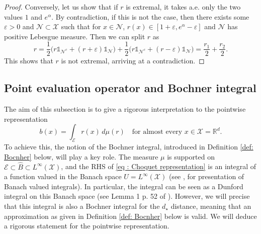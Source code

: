\documentclass[a4paper, 11pt]{article}
\theoremstyle{definition}
\newcommand{\R}{{\mathbb{R}}}
\newcommand{\cE}{{\mathcal{E}}}
\newcommand{\cX}{{\mathcal{X}}}
\newcommand{\indi}[1]{\mathds{1}_{#1}}
\begin{document}
{\begin{proof}
Conversely, let us show that if $r$ is extremal, it takes a.e. only the two values $1$ and $e^\alpha$. By contradiction, if this is not the case, then there exists some $\varepsilon > 0$ and $\mathcal{N} \subset \mathcal{X}$ such that for $x \in \mathcal{N}$, $r(x) \in [1+\varepsilon, e^\alpha - \varepsilon]$ and $\mathcal{N}$ has positive Lebesgue measure. Then we can split $r$ as
\[
r = \frac{1}{2} \bigl( r \indi{\mathcal{N}^c} + (r+\varepsilon) \indi{\mathcal{N}} \bigr)
+ \frac{1}{2} \bigl( r \indi{\mathcal{N}^c} + (r-\varepsilon) \indi{\mathcal{N}} \bigr)
= \frac{r_1}{2} + \frac{r_2}{2}.
\]
This shows that $r$ is not extremal, arriving at a contradiction.
\end{proof}





\subsection{Point evaluation operator and Bochner integral}{\label{ss:point eval}}
The aim of this subsection is to give a rigorous interpretation to the pointwise representation  
\[
b(x) = \int_{\mathcal{E}} r(x) \, d\mu(r)
\quad \text{for almost every } x \in \mathcal{X} = \R^d.
\]  
To achieve this, the notion of the Bochner integral, introduced in Definition \ref{def: Bocnher} below, will play a key role. 
The measure $\mu$ is supported on $\cE\subset \widehat{B}\subset L^\infty(\cX)$, and the RHS of \eqref{eq : Choquet representation} is an integral of a function valued in the Banach space $U=L^\infty(\cX)$ (see \cite{DieUhl_Book}, \cite{Lang_Book}  for presentation of Banach valued integrals). In particular, the integral can be seen as a Dunford integral on this Banach space (see Lemma 1 p. 52 of \cite{DieUhl_Book}). However, we will precise that this integral is also a Bochner integral for the $d_\star$ distance, meaning that an approximation as given in Definition \ref{def: Bocnher} below is valid. We will deduce a rigorous statement for the pointwise representation.




}
\end{document}
